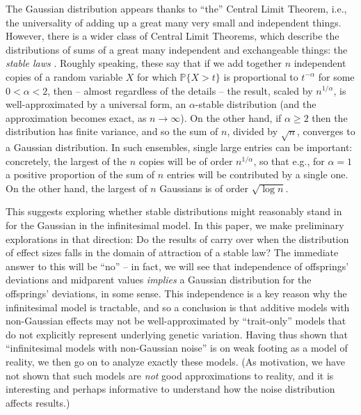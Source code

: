 \documentclass{article}
\renewcommand{\P}{\mathbb{P}}
\newcommand{\1}{\mathbbm{1}}
\theoremstyle{remark}
\theoremstyle{definition}
\begin{document}
The Gaussian distribution appears thanks to ``the'' Central Limit Theorem,
i.e., the universality of adding up a great many very small and independent things.
However, there is a wider class of Central Limit Theorems,
which describe the distributions of sums of a great many independent and exchangeable things:
the \emph{stable laws} \citep{gnedenko1968limit}.
Roughly speaking, these say that if we add together $n$ independent copies of a random variable $X$
for which $\P\{ X > t \}$ is proportional to $t^{-\alpha}$ for some $0 < \alpha < 2$,
then -- almost regardless of the details -- the result, scaled by $n^{1/\alpha}$,
is well-approximated by a universal form, an $\alpha$-stable distribution
(and the approximation becomes exact, as $n \to \infty$).
On the other hand, if $\alpha \ge 2$ then the distribution has finite variance,  
and so the sum of $n$, divided by $\sqrt{n}$, converges to a Gaussian distribution.
In such ensembles, single large entries can be important:
concretely, the largest of the $n$ copies will be of order $n^{1/\alpha}$,
so that e.g., for $\alpha=1$ a positive proportion of the sum of $n$ entries will be contributed by a single one.
On the other hand, the largest of $n$ Gaussians is of order $\sqrt{\log n}$. 

This suggests exploring whether stable distributions might reasonably stand in for the Gaussian
in the infinitesimal model. 
In this paper, we make preliminary explorations in that direction:
Do the results of \citet{barton2017infinitesimal}
carry over when the distribution of effect sizes falls in the domain of attraction of a stable law?
The immediate answer to this will be ``no'' --
in fact, we will see that independence of offsprings' deviations and midparent values 
\emph{implies} a Gaussian distribution for the offsprings' deviations, in some sense.
This independence is a key reason why the infinitesimal model is tractable,
and so a conclusion is that additive models with non-Gaussian effects may not be well-approximated
by ``trait-only'' models that do not explicitly represent underlying genetic variation.
Having thus shown that ``infinitesimal models with non-Gaussian noise'' is on weak footing as a model of reality,
we then go on to analyze exactly these models.
(As motivation,
we have not shown that such models are \emph{not} good approximations to reality,
and it is interesting and perhaps informative to understand how the noise distribution affects results.)
\end{document}
